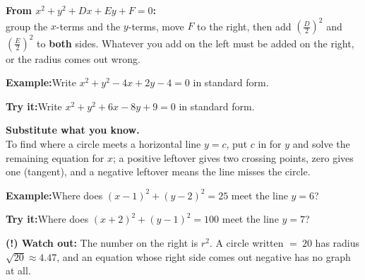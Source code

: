 \documentclass[12pt]{article}
\begin{document}
\begin{formulabox}\textbf{From $x^2 + y^2 + Dx + Ey + F = 0$:}\\[4pt]
group the $x$-terms and the $y$-terms, move $F$ to the right, then add
$\left(\tfrac{D}{2}\right)^2$ and $\left(\tfrac{E}{2}\right)^2$ to \textbf{both} sides.
Whatever you add on the left must be added on the right, or the radius comes out wrong.
\end{formulabox}
\begin{examplebox}\textbf{Example:}\quad Write $x^2 + y^2 - 4x + 2y - 4 = 0$ in standard form.
\end{examplebox}
\begin{tryitbox}\textbf{Try it:}\quad Write $x^2 + y^2 + 6x - 8y + 9 = 0$ in standard form.\\[2pt]
\end{tryitbox}

\begin{formulabox}\textbf{Substitute what you know.}\\[4pt]
To find where a circle meets a horizontal line $y = c$, put $c$ in for $y$ and solve the
remaining equation for $x$; a positive leftover gives two crossing points, zero gives one
(tangent), and a negative leftover means the line misses the circle.
\end{formulabox}
\begin{examplebox}\textbf{Example:}\quad Where does $(x-1)^2 + (y-2)^2 = 25$ meet the line $y = 6$?
\end{examplebox}
\begin{tryitbox}\textbf{Try it:}\quad Where does $(x+2)^2 + (y-1)^2 = 100$ meet the line $y = 7$?\\[2pt]
\end{tryitbox}

\begin{watchoutbox}\textbf{(!) Watch out:} The number on the right is $r^2$. A circle
written $=\ 20$ has radius $\sqrt{20} \approx 4.47$, and an equation whose right side comes
out negative has no graph at all.
\end{watchoutbox}
\end{document}
